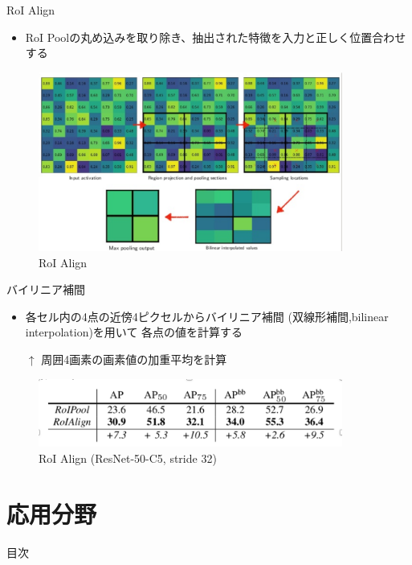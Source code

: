 \documentclass[aspectratio=169, dvipdfmx, 11pt]{beamer}
\begin{document}
\begin{frame}{RoI Align}
    \begin{itemize}
        \item RoI Poolの丸め込みを取り除き、抽出された特徴を入力と正しく位置合わせする \\
    \end{itemize}

    \begin{figure}[htbp]
        \centering
		\includegraphics[width=10cm]{./figures/roi_align.png}
        \caption{RoI Align}
    \end{figure}
\end{frame}

\begin{frame}{バイリニア補間}
    \begin{itemize}
        \item 各セル内の4点の近傍4ピクセルからバイリニア補間
        (双線形補間,bilinear interpolation)を用いて
        各点の値を計算する \\
        \item[$\uparrow$] 周囲4画素の画素値の加重平均を計算 \\
    \end{itemize}

    \begin{figure}[htbp]
        \centering
		\includegraphics[width=10cm]{./figures/pool_vs_align.png}
        \caption{RoI Align (ResNet-50-C5, stride 32)}
    \end{figure}
\end{frame}


\section{応用分野}
\begin{frame}{目次}
    \tableofcontents[currentsection]
\end{frame}
\end{document}

